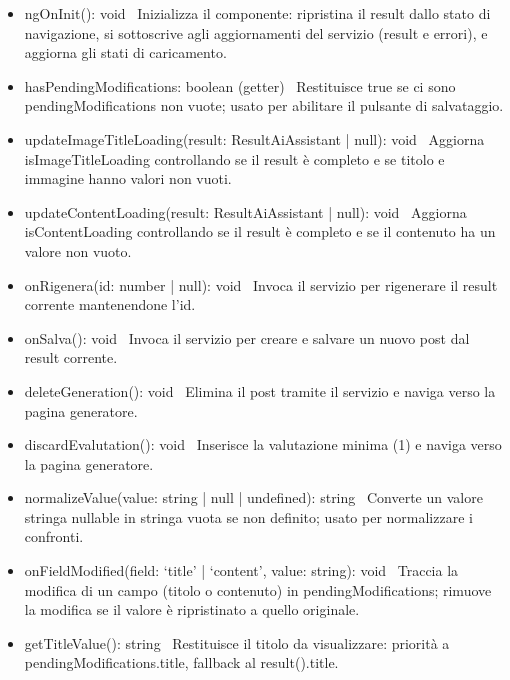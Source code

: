 \documentclass[a4paper,11pt]{article}
\begin{document}
\begin{itemize}[noitemsep, topsep=0pt]
\item ngOnInit(): void \
Inizializza il componente: ripristina il result dallo stato di navigazione, si sottoscrive agli aggiornamenti del servizio (result e errori), e aggiorna gli stati di caricamento.
\item hasPendingModifications: boolean (getter) \
Restituisce true se ci sono pendingModifications non vuote; usato per abilitare il pulsante di salvataggio.

\item updateImageTitleLoading(result: ResultAiAssistant | null): void \
Aggiorna isImageTitleLoading controllando se il result è completo e se titolo e immagine hanno valori non vuoti.

\item updateContentLoading(result: ResultAiAssistant | null): void \
Aggiorna isContentLoading controllando se il result è completo e se il contenuto ha un valore non vuoto.

\item onRigenera(id: number | null): void \
Invoca il servizio per rigenerare il result corrente mantenendone l'id.

\item onSalva(): void \
Invoca il servizio per creare e salvare un nuovo post dal result corrente.

\item deleteGeneration(): void \
Elimina il post tramite il servizio e naviga verso la pagina generatore.

\item discardEvalutation(): void \
Inserisce la valutazione minima (1) e naviga verso la pagina generatore.

\item normalizeValue(value: string | null | undefined): string \
Converte un valore stringa nullable in stringa vuota se non definito; usato per normalizzare i confronti.

\item onFieldModified(field: `title' | `content', value: string): void \
Traccia la modifica di un campo (titolo o contenuto) in pendingModifications; rimuove la modifica se il valore è ripristinato a quello originale.

\item getTitleValue(): string \
Restituisce il titolo da visualizzare: priorità a pendingModifications.title, fallback al result().title.


\end{itemize}
\end{document}

